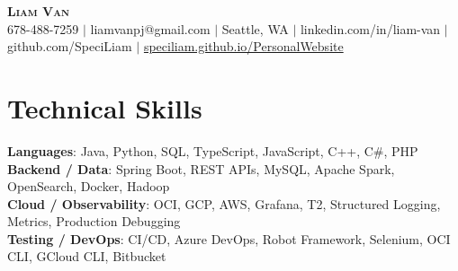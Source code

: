 \documentclass[letterpaper,11pt]{article}
\begin{document}

%
\begin{center}
    \textbf{\Huge \scshape Liam Van} \\ \vspace{1pt}
    \small 678-488-7259 $|$ \small {liamvanpj@gmail.com} $|$ Seattle, WA
 {{$|$ linkedin.com/in/liam-van} {$|$ github.com/SpeciLiam} {$|$ \href{https://speciliam.github.io/PersonalWebsite}{speciliam.github.io/PersonalWebsite}}}

\end{center}

\section{Technical Skills}
 \begin{itemize}[leftmargin=0.15in, label={}]
    \small{\item{
     \textbf{Languages}{: Java, Python, SQL, TypeScript, JavaScript, C++, C\#, PHP} \\
     \textbf{Backend / Data}{: Spring Boot, REST APIs, MySQL, Apache Spark, OpenSearch, Docker, Hadoop} \\
     \textbf{Cloud / Observability}{: OCI, GCP, AWS, Grafana, T2, Structured Logging, Metrics, Production Debugging} \\
     \textbf{Testing / DevOps}{: CI/CD, Azure DevOps, Robot Framework, Selenium, OCI CLI, GCloud CLI, Bitbucket} \\
    }}
 \end{itemize}
%
\end{document}
